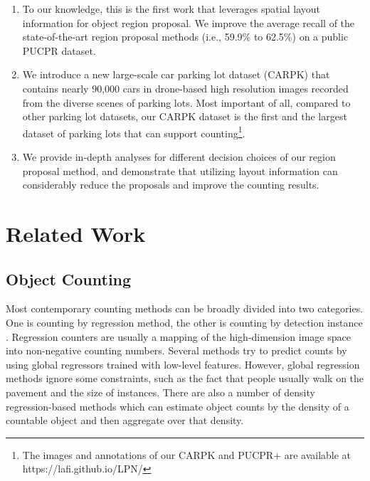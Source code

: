 \documentclass[10pt,twocolumn,letterpaper]{article}
\begin{document}
\begin{enumerate}
\item To our knowledge, this is the first work that leverages spatial layout information for object region proposal. We improve the average recall of the state-of-the-art region proposal methods (i.e., 59.9\% \cite{21_ren2015faster} to 62.5\%) on a public PUCPR dataset.

\item We introduce a new large-scale car parking lot dataset (CARPK) that contains nearly 90,000 cars in drone-based high resolution images recorded from the diverse scenes of parking lots. 
Most important of all, compared to other parking lot datasets, our CARPK dataset is the first and the largest dataset of parking lots that can support counting\footnote{The images and annotations of our CARPK and PUCPR+ are available at https://lafi.github.io/LPN/}.

\item We provide in-depth analyses for different decision choices of our region proposal method, and demonstrate that utilizing layout information can considerably reduce the proposals and improve the counting results.
\end{enumerate}

\section{Related Work}


\subsection{Object Counting}

Most contemporary counting methods can be broadly divided into two categories. One is counting by regression method, the other is counting by detection instance \cite{38_moranduzzo2014automatic, 49_kamenetsky2015aerial}. Regression counters are usually a mapping of the high-dimension image space into non-negative counting numbers. Several methods \cite{44_an2007face, 45_chan2008privacy, 46_chen2013cumulative, 47_chen2012feature, 48_kong2006viewpoint} try to predict counts by using global regressors trained with low-level features. However, global regression methods ignore some constraints, such as the fact that people usually walk on the pavement and the size of instances. There are also a number of density regression-based methods \cite{51_rodriguez2011density, 52_lempitsky2010learning, 54_arteta2014interactive} which can estimate object counts by the density of a countable object and then aggregate over that density.
\end{document}
